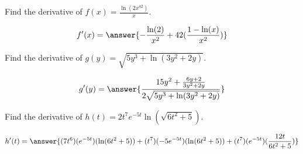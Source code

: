 \documentclass{ximera}
\author{Bobby Ramsey}
\begin{document}
\begin{exercise}
	Find the derivative of $\displaystyle f(x) = \frac{\ln(2x^{42})}{x}$.
	
	\[ f'(x) = \answer{  -\frac{\ln(2)}{x^2} + 42(\frac{1-\ln(x)}{x^2})        } \]
\end{exercise}

\begin{exercise}
	Find the derivative of $\displaystyle g(y) = \sqrt{5y^3+\ln(3y^2+2y)}$.

	\[ g'(y) = \answer{\frac{15y^2 + \frac{6y+2}{3y^2+2y}}{2\sqrt{5y^3+\ln(3y^2+2y)}}  }\]
\end{exercise}

\begin{exercise}
	Find the derivative of $\displaystyle h(t) = 2t^7e^{-5t}\ln(\sqrt{6t^2+5})$.
	
	\[ h'(t) = \answer{    (7t^6)(e^{-5t})(\ln(6t^2+5))+(t^7)(-5e^{-5t})(\ln(6t^2+5))+(t^7)(e^{-5t})(\frac{12t}{6t^2+5})   }\]
\end{exercise}
\end{document}
